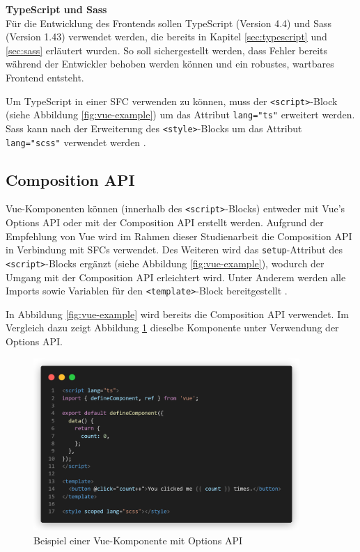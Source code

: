 \textbf{TypeScript und Sass} \\
Für die Entwicklung des Frontends sollen TypeScript (Version 4.4) und Sass (Version 1.43) verwendet werden, die bereits in Kapitel \ref{sec:typescript} und \ref{sec:sass} erläutert wurden. So soll sichergestellt werden, dass Fehler bereits während der Entwickler behoben werden können und ein robustes, wartbares Frontend entsteht.

Um TypeScript in einer \ac{SFC} verwenden zu können, muss der \lstinline{<script>}-Block (siehe Abbildung \ref{fig:vue-example}) um das Attribut \lstinline{lang="ts"} erweitert werden. Sass kann nach der Erweiterung des \lstinline{<style>}-Blocks um das Attribut \lstinline{lang="scss"} verwendet werden \cite[vgl.][]{VueSFC}.

%
%
\subsection{Composition API}
Vue-Komponenten können (innerhalb des \lstinline{<script>}-Blocks) entweder mit Vue's Options API oder mit der Composition API erstellt werden. Aufgrund der Empfehlung von Vue wird im Rahmen dieser Studienarbeit die Composition API in Verbindung mit \acp{SFC} verwendet. Des Weiteren wird das \lstinline{setup}-Attribut des \lstinline{<script>}-Blocks ergänzt (siehe Abbildung \ref{fig:vue-example}), wodurch der Umgang mit der Composition API erleichtert wird. Unter Anderem werden alle Imports sowie Variablen für den \lstinline{<template>}-Block bereitgestellt \cite[vgl.][]{VueIntroduction}.

In Abbildung \ref{fig:vue-example} wird bereits die Composition API verwendet. Im Vergleich dazu zeigt Abbildung \ref{fig:vue-example-options-api} dieselbe Komponente unter Verwendung der Options API.

\begin{figure}[!htb]
  \includegraphics[width=0.9\textwidth]{images/vue-example-options-api.png}
  \centering
  \caption[Beispiel einer Vue-Komponente mit Options API]{Beispiel einer Vue-Komponente mit Options API \cites[vgl.][]{VueIntroduction}[vgl.][]{VueSFC}}
  \label{fig:vue-example-options-api}
\end{figure}

